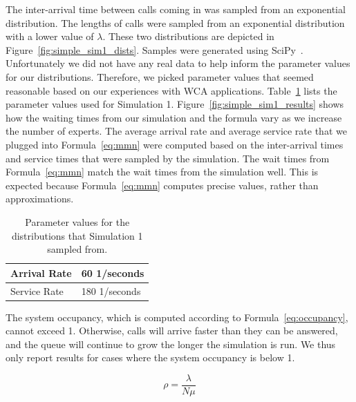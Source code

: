 The inter-arrival time between calls coming in was sampled from an exponential
distribution.
The lengths of calls were sampled from an exponential distribution with
a lower value of $\lambda$.
These two distributions are depicted in Figure~\ref{fig:simple_sim1_dists}.
Samples were generated using SciPy~\cite{scipy}.
Unfortunately we did not have any real data to help inform the parameter values
for our distributions.
Therefore, we picked parameter values that seemed reasonable based on our
experiences with WCA applications.
Table~\ref{tab:sim1_params} lists the parameter values used for Simulation 1.
Figure~\ref{fig:simple_sim1_results} shows how the waiting times from our
simulation and the formula vary as we increase the number of experts.
The average arrival rate and average service rate that we plugged into
Formula~\ref{eq:mmn} were computed based on the inter-arrival times and service
times that were sampled by the simulation.
The wait times from Formula~\ref{eq:mmn} match the wait times from the
simulation well.
This is expected because Formula~\ref{eq:mmn} computes precise values, rather
than approximations.

\begin{table}
  \begin{tabular}{|l|l|}
    \hline
    Arrival Rate & 60 1/seconds\\
    \hline
    Service Rate & 180 1/seconds\\
    \hline
  \end{tabular}
  \caption{Parameter values for the distributions that Simulation 1 sampled
    from.}\label{tab:sim1_params}
\end{table}

The system occupancy, which is computed according to Formula~\ref{eq:occupancy},
cannot exceed 1.
Otherwise, calls will arrive faster than they can be answered, and the queue
will continue to grow the longer the simulation is run.
We thus only report results for cases where the system occupancy is below 1.

\begin{equation}
\rho = \frac{\lambda}{N \mu}
\label{eq:occupancy}
\end{equation}

